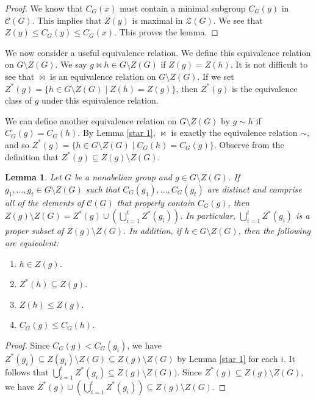 \documentclass[12pt]{amsart}
\newtheorem{lemma}[theorem]{Lemma}
\begin{document}
{\begin{proof}
We know that $C_G (x)$ must contain a minimal subgroup $C_G (y)$ in $\mathcal {C} (G)$.  This implies that $Z(y)$ is maximal in $\mathcal{Z} (G)$.  We see that $Z(y) \le C_G (y) \le C_G (x)$.  This proves the lemma.
\end{proof}

We now consider a useful equivalence relation.  We define this equivalence relation on $G \setminus Z(G)$.  We say $g \bowtie h \in G \setminus Z(G)$ if $Z(g) = Z(h)$.  It is not difficult to see that $\bowtie$ is an equivalence relation on $G \setminus Z(G)$.  If we set $Z^* (g) = \{ h \in G \setminus Z(G) \mid Z(h) = Z(g) \}$, then $Z^* (g)$ is the equivalence class of $g$ under this equivalence relation.   

We can define another equivalence relation on $G \setminus Z(G)$ by $g \sim h$ if $C_G (g) = C_G (h)$.  By Lemma \ref{star 1}, $\bowtie$ is exactly the equivalence relation $\sim$, and so $Z^* (g) = \{h \in G \setminus Z(G) \mid C_G (h) = C_G (g)\}$.  Observe from the definition that $Z^* (g) \subseteq Z(g) \setminus Z(G)$.

\begin{lemma} \label{star 2}
Let $G$ be a nonabelian group and $g \in G \setminus Z(G)$.  If $g_1, \dots, g_t \in G \setminus Z(G)$ such that $C_G (g_1), \dots, C_G (g_t)$ are distinct and comprise all of the elements of ${\mathcal C} (G)$ that properly contain $C_G (g)$, then $\displaystyle Z(g) \setminus Z(G) = Z^* (g) \cup (\bigcup_{i=1}^t Z^* (g_i))$.   In particular, $\displaystyle \bigcup_{i=1}^t Z^* (g_i)$ is a proper subset of $Z(g) \setminus Z(G)$. In addition, if $h \in G \setminus Z(G)$, then the following are equivalent:
\begin{enumerate}
\item $h \in Z(g)$.
\item $Z^* (h) \subseteq Z(g)$.
\item $Z(h) \le Z(g)$.
\item $C_G (g) \le C_G (h)$.
\end{enumerate}
\end{lemma}

\begin{proof}
Since $C_G (g) < C_G (g_i)$, we have $Z^* (g_i) \subseteq Z(g_i) \setminus Z(G) \subseteq Z(g) \setminus Z(G)$ by Lemma \ref{star 1} for each $i$.  It follows that $\displaystyle \bigcup_{i=1}^t Z^* (g_i) \subseteq Z(g) \setminus Z(G))$.  Since $Z^* (g) \subseteq Z(g) \setminus Z (G)$, we have $\displaystyle Z^* (g) \cup (\bigcup_{i=1}^t Z^* (g_i)) \subseteq Z(g) \setminus Z(G)$.
	

\end{proof}}
\end{document}
